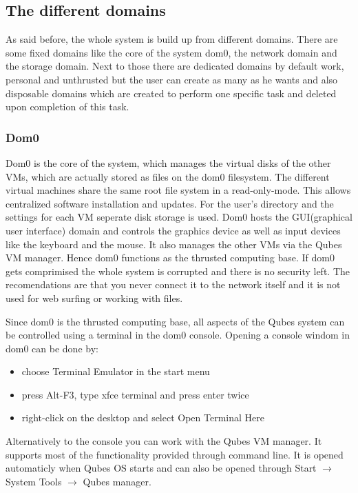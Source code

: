 \documentclass[runningheads,a4paper]{article}
\begin{document}
\subsection{The different domains}
As said before, the whole system is build up from different
domains. There are some fixed domains like the core of the system
dom0, the network domain and the storage domain. Next to those there
are dedicated domains by default work, personal and unthrusted but the
user can create as many as he wants and also disposable domains which
are created to perform one specific task and deleted upon completion
of this task.

\subsubsection{Dom0}

Dom0 is the core of the system, which manages the virtual disks of the
other VMs, which are actually stored as files on the dom0
filesystem. The different virtual machines share the same root file
system in a read-only-mode. This allows centralized software
installation and updates. For the user's directory and the settings
for each VM seperate disk storage is used. 
Dom0  hosts the GUI(graphical user interface) domain and controls the
graphics device as well as input devices like the keyboard and the
mouse. It also
manages the other VMs via the Qubes VM manager. Hence dom0 functions as the thrusted computing base. If dom0
gets comprimised the whole system is corrupted and there is no
security left. The recomendations are that you never connect it to the
network itself and it is not used for web surfing or working with
files.

Since dom0 is the thrusted computing base, all aspects of the Qubes
system can be controlled using a terminal in the dom0 console. Opening
a console windom in dom0 can be done by:
\begin{itemize}
\item choose Terminal Emulator in the start menu
\item press Alt-F3, type xfce terminal and press enter twice
\item right-click on the desktop and select Open Terminal Here
\end{itemize}
Alternatively to the console you can work with the Qubes VM
manager. It supports most of the functionality provided through
command line. It is opened automaticly when Qubes OS starts and can
also be opened through Start $\rightarrow$ System Tools $\rightarrow$
Qubes manager.
\end{document}
